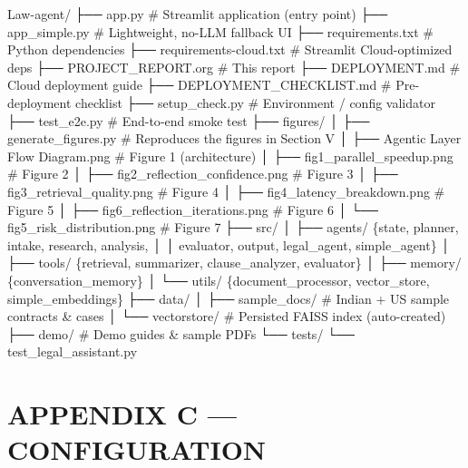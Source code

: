 \documentclass[
  twocolumn]{article}
\newenvironment{Shaded}{}{}
\newcommand{\NormalTok}[1]{#1}
\begin{document}
\begin{Shaded}
\begin{Highlighting}[]
\NormalTok{Law{-}agent/}
\NormalTok{├── app.py                              \# Streamlit application (entry point)}
\NormalTok{├── app\_simple.py                       \# Lightweight, no{-}LLM fallback UI}
\NormalTok{├── requirements.txt                    \# Python dependencies}
\NormalTok{├── requirements{-}cloud.txt              \# Streamlit Cloud{-}optimized deps}
\NormalTok{├── PROJECT\_REPORT.org                  \# This report}
\NormalTok{├── DEPLOYMENT.md                       \# Cloud deployment guide}
\NormalTok{├── DEPLOYMENT\_CHECKLIST.md             \# Pre{-}deployment checklist}
\NormalTok{├── setup\_check.py                      \# Environment / config validator}
\NormalTok{├── test\_e2e.py                         \# End{-}to{-}end smoke test}
\NormalTok{├── figures/}
\NormalTok{│   ├── generate\_figures.py             \# Reproduces the figures in Section V}
\NormalTok{│   ├── Agentic Layer Flow Diagram.png  \# Figure 1 (architecture)}
\NormalTok{│   ├── fig1\_parallel\_speedup.png       \# Figure 2}
\NormalTok{│   ├── fig2\_reflection\_confidence.png  \# Figure 3}
\NormalTok{│   ├── fig3\_retrieval\_quality.png      \# Figure 4}
\NormalTok{│   ├── fig4\_latency\_breakdown.png      \# Figure 5}
\NormalTok{│   ├── fig6\_reflection\_iterations.png  \# Figure 6}
\NormalTok{│   └── fig5\_risk\_distribution.png      \# Figure 7}
\NormalTok{├── src/}
\NormalTok{│   ├── agents/   \{state, planner, intake, research, analysis,}
\NormalTok{│   │             evaluator, output, legal\_agent, simple\_agent\}}
\NormalTok{│   ├── tools/    \{retrieval, summarizer, clause\_analyzer, evaluator\}}
\NormalTok{│   ├── memory/   \{conversation\_memory\}}
\NormalTok{│   └── utils/    \{document\_processor, vector\_store, simple\_embeddings\}}
\NormalTok{├── data/}
\NormalTok{│   ├── sample\_docs/                    \# Indian + US sample contracts \& cases}
\NormalTok{│   └── vectorstore/                    \# Persisted FAISS index (auto{-}created)}
\NormalTok{├── demo/                               \# Demo guides \& sample PDFs}
\NormalTok{└── tests/}
\NormalTok{    └── test\_legal\_assistant.py}
\end{Highlighting}
\end{Shaded}

\section{APPENDIX C --- CONFIGURATION}\label{appendix-c-configuration}
\end{document}
